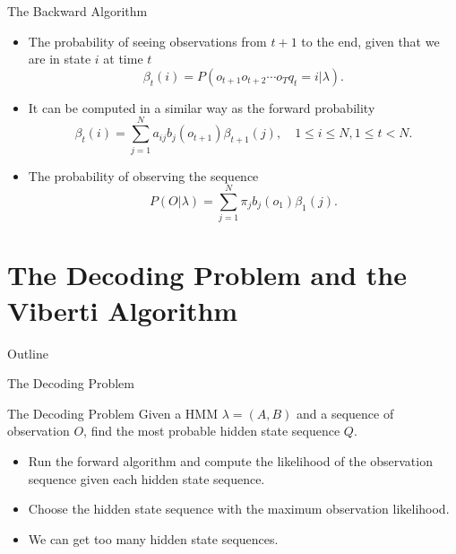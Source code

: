 \documentclass{beamer}
\begin{document}
\begin{frame}{The Backward Algorithm}
	\begin{itemize}
		\item The probability of seeing observations from $t+1$ to the end, given that we are in state $i$ at time $t$
		\begin{equation}
			\beta_t(i) = P(o_{t+1}o_{t+2}\cdots o_T q_t = i \vert \lambda).
		\end{equation}
		\item It can be computed in a similar way as the forward probability
		\begin{equation}
			\beta_t(i) = \sum_{j=1}^N a_{ij}b_j(o_{t+1})\beta_{t+1}(j), \quad 1 \leq i \leq N, 1 \leq t < N.
		\end{equation}
		\item The probability of observing the sequence
		\begin{equation}
			P(O \vert \lambda) = \sum_{j=1}^N \pi_j b_j(o_1) \beta_1(j).
		\end{equation}
	\end{itemize}
\end{frame}


\section{The Decoding Problem and the Viberti Algorithm}
\begin{frame}{Outline}
	\tableofcontents[currentsection]
\end{frame}
\begin{frame}{The Decoding Problem }
	\begin{block}{The Decoding Problem}
		Given a HMM $\lambda = (A,B)$ and a sequence of observation $O$, find the most probable hidden state sequence $Q$.
	\end{block}
	\begin{itemize}
		\item Run the forward algorithm and compute the likelihood of the observation sequence given each hidden state sequence.
		\item Choose the hidden state sequence with the maximum observation likelihood.
		\item We can get too many hidden state sequences.
	\end{itemize}
\end{frame}
\end{document}
